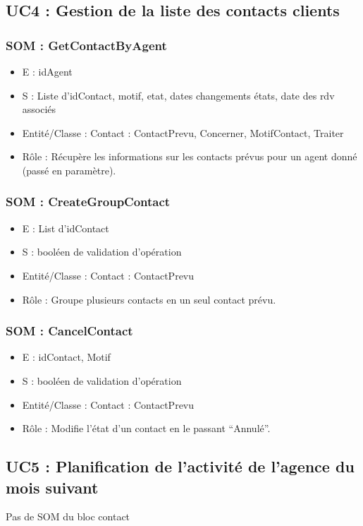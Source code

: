\subsection{UC4 : Gestion de la liste des contacts clients}
\subsubsection{SOM : GetContactByAgent}
	\begin{itemize}
		\item E : idAgent
		\item S : Liste d’idContact, motif, etat, dates changements états, date des rdv associés
		\item Entité/Classe : Contact : ContactPrevu, Concerner, MotifContact, Traiter
		\item Rôle : Récupère les informations sur les contacts prévus pour un agent donné
	(passé en paramètre).
	\end{itemize}

\subsubsection{SOM : CreateGroupContact}
	\begin{itemize}
		\item E : List d’idContact
		\item S : booléen de validation d’opération
		\item Entité/Classe : Contact : ContactPrevu
		\item Rôle : Groupe plusieurs contacts en un seul contact prévu.
	\end{itemize}

\subsubsection{SOM : CancelContact}
	\begin{itemize}
		\item E : idContact, Motif
		\item S : booléen de validation d’opération
		\item Entité/Classe : Contact : ContactPrevu
		\item Rôle : Modifie l’état d’un contact en le passant “Annulé”.
	\end{itemize}



\subsection{UC5 : Planification de l’activité de l’agence du mois suivant}
Pas de SOM du bloc contact



